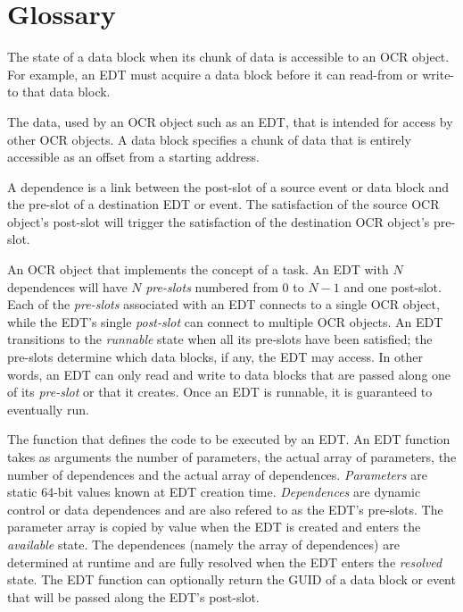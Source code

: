 %
%
%
\section{Glossary}
\label{sec:Glossary}
\glossarydefstart
The state of a data block when its chunk of data is accessible to an
OCR object. For example, an EDT must acquire a data block before it
can read-from or write-to that data block.
\glossarydefend

\glossarydefstart
The data, used by an OCR object such as an EDT, that is intended for
access by other OCR objects. A data block specifies
a chunk of data that is entirely accessible as an offset from a starting address.
\glossarydefend

\glossarydefstart
A dependence is a link between the post-slot of a source event or
data block and the pre-slot of a destination EDT or event. The
satisfaction of the source OCR object's post-slot will trigger the
satisfaction of the destination OCR object's pre-slot.
\glossarydefend

\glossarydefstart
An OCR object that implements the concept of a task. An EDT with $N$
dependences will have $N$ \emph{pre-slots} numbered from $0$ to $N-1$
and one post-slot.
Each of the \emph{pre-slots} associated with an EDT connects to a
single OCR object, while the EDT’s single \emph{post-slot} can connect
to multiple OCR objects. An EDT transitions to the \emph{runnable} state when all its
pre-slots have been satisfied; the pre-slots determine which
data blocks, if any, the EDT may access. In other words, an EDT can
only read and write to data blocks that are passed along one of its
\emph{pre-slot} or that it creates. Once an EDT is runnable, it is guaranteed to
eventually run.
\glossarydefend


\glossarydefstart
The function that defines the code to be executed by an EDT. An EDT function
takes as arguments the number of parameters, the actual array of
parameters, the number of dependences and the actual array of
dependences. \emph{Parameters} are static 64-bit values known at EDT
creation time. \emph{Dependences} are dynamic control or data
dependences and are also refered to as the EDT's pre-slots. The
parameter array is copied by value when the EDT is created and enters
the \emph{available} state. The dependences (namely the array of dependences) are
determined at runtime and are fully resolved when the EDT enters the
\emph{resolved} state. The EDT function can optionally return the GUID
of a data block or event that will be passed along the EDT's post-slot.

